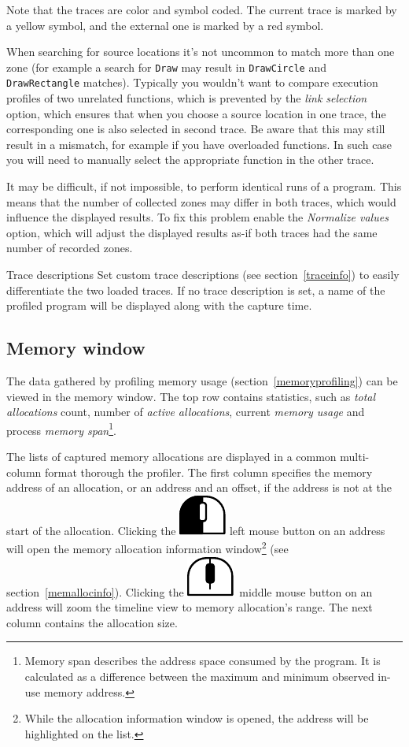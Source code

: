 \documentclass[hidelinks,titlepage,a4paper]{article}
\newcommand{\LMB}{\includegraphics[height=.8\baselineskip]{icons/lmb}}
\newcommand{\MMB}{\includegraphics[height=.8\baselineskip]{icons/mmb}}
\begin{document}
Note that the traces are color and symbol coded. The current trace is marked by a yellow \faLemon{} symbol, and the external one is marked by a red \faGem{} symbol.

When searching for source locations it's not uncommon to match more than one zone (for example a search for \texttt{Draw} may result in \texttt{DrawCircle} and \texttt{DrawRectangle} matches). Typically you wouldn't want to compare execution profiles of two unrelated functions, which is prevented by the \emph{link selection} option, which ensures that when you choose a source location in one trace, the corresponding one is also selected in second trace. Be aware that this may still result in a mismatch, for example if you have overloaded functions. In such case you will need to manually select the appropriate function in the other trace.

It may be difficult, if not impossible, to perform identical runs of a program. This means that the number of collected zones may differ in both traces, which would influence the displayed results. To fix this problem enable the \emph{Normalize values} option, which will adjust the displayed results as-if both traces had the same number of recorded zones.

\begin{bclogo}[
noborder=true,
couleur=black!5,
logo=\bclampe
]{Trace descriptions}
Set custom trace descriptions (see section~\ref{traceinfo}) to easily differentiate the two loaded traces. If no trace description is set, a name of the profiled program will be displayed along with the capture time.
\end{bclogo}

\subsection{Memory window}
\label{memorywindow}

The data gathered by profiling memory usage (section~\ref{memoryprofiling}) can be viewed in the memory window. The top row contains statistics, such as \emph{total allocations} count, number of \emph{active allocations}, current \emph{memory usage} and process \emph{memory span}\footnote{Memory span describes the address space consumed by the program. It is calculated as a difference between the maximum and minimum observed in-use memory address.}.

The lists of captured memory allocations are displayed in a common multi-column format thorough the profiler. The first column specifies the memory address of an allocation, or an address and an offset, if the address is not at the start of the allocation. Clicking the \LMB{} left mouse button on an address will open the memory allocation information window\footnote{While the allocation information window is opened, the address will be highlighted on the list.} (see section~\ref{memallocinfo}). Clicking the \MMB{}~middle mouse button on an address will zoom the timeline view to memory allocation's range. The next column contains the allocation size.
\end{document}
